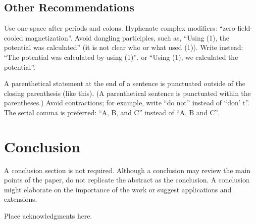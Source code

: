\documentclass{ifacconf}
\begin{document}
\subsection{Other Recommendations}

Use one space after periods and colons. Hyphenate complex modifiers:
``zero-field-cooled magnetization''. Avoid dangling participles, such
as, ``Using (1), the potential was calculated'' (it is not clear who or
what used (1)). Write instead: ``The potential was calculated by using
(1)'', or ``Using (1), we calculated the potential''.

A parenthetical statement at the end of a sentence is punctuated
outside of the closing parenthesis (like this). (A parenthetical
sentence is punctuated within the parentheses.) Avoid contractions;
for example, write ``do not'' instead of ``don' t''. The serial comma
is preferred: ``A, B, and C'' instead of ``A, B and C''.


\section{Conclusion}

A conclusion section is not required. Although a conclusion may review
the main points of the paper, do not replicate the abstract as the
conclusion. A conclusion might elaborate on the importance of the work
or suggest applications and extensions.

\begin{ack}
Place acknowledgments here.
\end{ack}

                                                   


\end{document}
